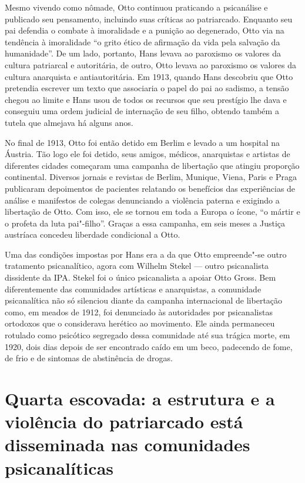 Mesmo vivendo como nômade, Otto continuou praticando a psicanálise e
publicado seu pensamento, incluindo suas críticas ao patriarcado.
Enquanto seu pai defendia o combate à imoralidade e a punição ao
degenerado, Otto via na tendência à imoralidade ``o grito ético de
afirmação da vida pela salvação da humanidade''. De um lado, portanto,
Hans levava ao paroxismo os valores da cultura patriarcal e autoritária,
de outro, Otto levava ao paroxismo os valores da cultura anarquista e
antiautoritária. Em 1913, quando Hans descobriu que Otto pretendia
escrever um texto que associaria o papel do pai ao sadismo, a tensão
chegou ao limite e Hans usou de todos os recursos que seu prestígio lhe
dava e conseguiu uma ordem judicial de internação de seu filho, obtendo
também a tutela que almejava há alguns anos.

No final de 1913, Otto foi então detido em Berlim e levado a um hospital
na Áustria. Tão logo ele foi detido, seus amigos, médicos, anarquistas e
artistas de diferentes cidades começaram uma campanha de libertação que
atingiu proporção continental. Diversos jornais e revistas de Berlim,
Munique, Viena, Paris e Praga publicaram depoimentos de pacientes
relatando os benefícios das experiências de análise e manifestos de
colegas denunciando a violência paterna e exigindo a libertação de Otto.
Com isso, ele se tornou em toda a Europa o ícone, ``o mártir e o profeta
da luta pai"-filho''. Graças a essa campanha, em seis meses a Justiça
austríaca concedeu liberdade condicional a Otto.

Uma das condições impostas por Hans era a da que Otto empreende"-se outro
tratamento psicanalítico, agora com Wilhelm Stekel --- outro psicanalista
dissidente da IPA. Stekel foi o único psicanalista a apoiar Otto Gross.
Bem diferentemente das comunidades artísticas e anarquistas, a
comunidade psicanalítica não só silenciou diante da campanha
internacional de libertação como, em meados de 1912, foi denunciado às
autoridades por psicanalistas ortodoxos que o considerava herético ao
movimento. Ele ainda permaneceu rotulado como psicótico segregado dessa
comunidade até sua trágica morte, em 1920, dois dias depois de ser
encontrado caído em um beco, padecendo de fome, de frio e de sintomas de
abstinência de drogas.

\section{Quarta escovada: a estrutura e a violência do patriarcado está
disseminada nas comunidades psicanalíticas}


